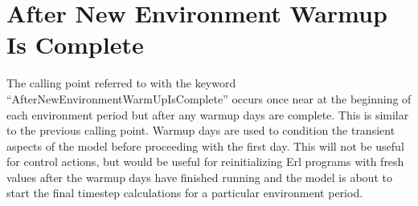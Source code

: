 \section{After New Environment Warmup Is Complete}\label{after-new-environment-warmup-is-complete}

The calling point referred to with the keyword ``AfterNewEnvironmentWarmUpIsComplete'' occurs once near at the beginning of each environment period but after any warmup days are complete. This is similar to the previous calling point. Warmup days are used to condition the transient aspects of the model before proceeding with the first day. This will not be useful for control actions, but would be useful for reinitializing Erl programs with fresh values after the warmup days have finished running and the model is about to start the final timestep calculations for a particular environment period.
